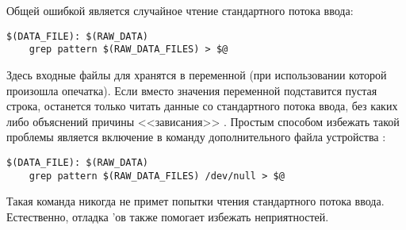 Общей ошибкой является случайное чтение стандартного потока ввода:

{\footnotesize
\begin{verbatim}
$(DATA_FILE): $(RAW_DATA)
    grep pattern $(RAW_DATA_FILES) > $@
\end{verbatim}
}

Здесь входные файлы для  хранятся в переменной (при
использовании которой произошла опечатка). Если вместо значения
переменной подставится пустая строка,  останется только
читать данные со стандартного потока ввода, без каких либо объяснений
причины <<зависания>> \GNUmake{}. Простым способом избежать такой
проблемы является включение в команду дополнительного файла устройства
:

{\footnotesize
\begin{verbatim}
$(DATA_FILE): $(RAW_DATA)
    grep pattern $(RAW_DATA_FILES) /dev/null > $@
\end{verbatim}
}

Такая команда никогда не примет попытки чтения стандартного потока
ввода. Естественно, отладка \Makefile{}'ов также помогает избежать
неприятностей.
